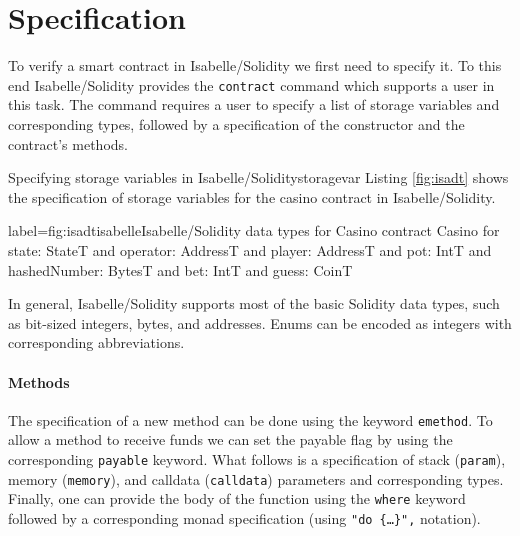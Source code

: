 \documentclass[a4paper,UKenglish,cleveref, autoref, thm-restate]{oasics-v2021}
\begin{document}
%
\section{Specification}
To verify a smart contract in Isabelle/Solidity we first need to specify it.
To this end Isabelle/Solidity provides the \texttt{\color{isacom}contract} command which supports a user in this task.
The command requires a user to specify a list of storage variables and corresponding types, followed by a specification of the constructor and the contract's methods.

\begin{Example}{Specifying storage variables in Isabelle/Solidity}{storagevar}
Listing \ref{fig:isadt} shows the specification of storage variables for the casino contract in Isabelle/Solidity.
\enlargethispage{.2cm}\vspace{.1cm}
\begin{code}{label={fig:isadt}}{isabelle}{Isabelle/Solidity data types for Casino%
  \hfill{}%
}
contract Casino
  for state: StateT
  and operator: AddressT
  and player: AddressT
  and pot: IntT
  and hashedNumber: BytesT
  and bet: IntT
  and guess: CoinT
\end{code}
\end{Example}
In general, Isabelle/Solidity supports most of the basic Solidity data types, such as bit-sized integers, bytes, and addresses.
Enums can be encoded as integers with corresponding abbreviations.
%
\paragraph*{Methods}
The specification of a new method can be done using the keyword \texttt{\color{isargreen}emethod}.
To allow a method to receive funds we can set the payable flag by using the corresponding \texttt{\color{isargreen}payable} keyword.
What follows is a specification of stack (\texttt{\color{isargreen}param}), memory (\texttt{\color{isargreen}memory}), and calldata (\texttt{\color{isargreen}calldata}) parameters and corresponding types.
Finally, one can provide the body of the function using the \texttt{\color{isargreen}where} keyword followed by a corresponding monad specification (using \texttt{"\texttt{\color{isarlight}do} \{\dots\}",} notation).
\end{document}

